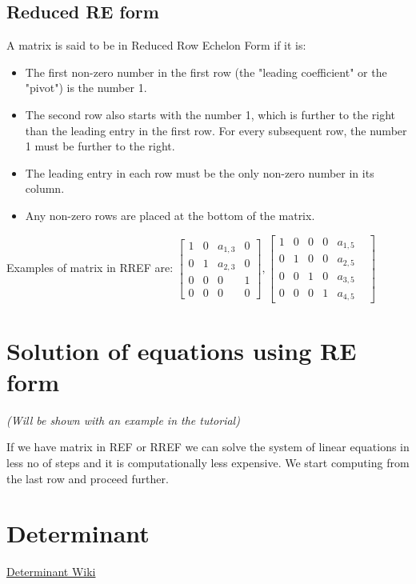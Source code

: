 \documentclass[a4paper]{article}
\begin{document}
\subsection{Reduced RE form}
A matrix is said to be in Reduced Row Echelon Form if it is:
\begin{itemize}
    \item The first non-zero number in the first row (the "leading coefficient" or the "pivot") is the number 1.
    \item The second row also starts with the number 1, which is further to the right than the leading entry in the first row. For every subsequent row, the number 1 must be further to the right.
    \item The leading entry in each row must be the only non-zero number in its column.
    \item Any non-zero rows are placed at the bottom of the matrix.
\end{itemize}
Examples of matrix in RREF are: 
$
\begin{bmatrix}
    1 & 0 & a_{1,3} & 0 \\ 
    0 & 1 &  a_{2,3} & 0 \\
    0 & 0 & 0  &    1  \\
    0 & 0 & 0 & 0 
    \end{bmatrix}
    ,
    \begin{bmatrix}
    1 & 0 & 0 & 0 & a_{1,5} \\ 
    0 & 1 &  0 & 0 & a_{2,5} \\
    0 & 0 & 1  & 0 & a_{3,5}  \\
    0 & 0 & 0 & 1 &  a_{4,5} &
    \end{bmatrix}
$

\section{Solution of equations using RE form}
\textit{(Will be shown with an example in the tutorial)}

If we have matrix in REF or RREF we can solve the system of linear equations in less no of steps and it is computationally less expensive.
We start computing from the last row and proceed further. 

\section{Determinant}
\href{https://brilliant.org/wiki/expansion-of-determinants/}{Determinant Wiki}
\end{document}
